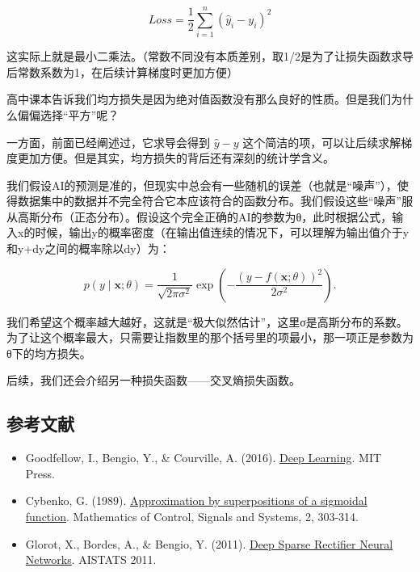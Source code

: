 \[
Loss=\frac{1}{2}\sum_{i=1}^{n}(\hat{y}_i-y_i)^2
\]

这实际上就是最小二乘法。（常数不同没有本质差别，取1/2是为了让损失函数求导后常数系数为1，在后续计算梯度时更加方便）

高中课本告诉我们均方损失是因为绝对值函数没有那么良好的性质。但是我们为什么偏偏选择``平方''呢？

一方面，前面已经阐述过，它求导会得到 \(\hat{y}-y\) 这个简洁的项，可以让后续求解梯度更加方便。但是其实，均方损失的背后还有深刻的统计学含义。

我们假设AI的预测是准的，但现实中总会有一些随机的误差（也就是``噪声''），使得数据集中的数据并不完全符合它本应该符合的函数分布。我们假设这些``噪声''服从高斯分布（正态分布）。假设这个完全正确的AI的参数为θ，此时根据公式，输入x的时候，输出y的概率密度（在输出值连续的情况下，可以理解为输出值介于y和y+dy之间的概率除以dy）为：

\[
p(y \mid \mathbf{x};\theta)=\frac{1}{\sqrt{2\pi\sigma^2}}\exp\left(-\frac{(y-f(\mathbf{x};\theta))^2}{2\sigma^2}\right).
\]

我们希望这个概率越大越好，这就是``极大似然估计''，这里σ是高斯分布的系数。为了让这个概率最大，只需要让指数里的那个括号里的项最小，那一项正是参数为θ下的均方损失。

后续，我们还会介绍另一种损失函数------交叉熵损失函数。

\FloatBarrier
{}
\hypertarget{ux53c2ux8003ux6587ux732e-1}{%
\subsection{参考文献}\label{ux53c2ux8003ux6587ux732e-1}}

\vspace{0.25em}
\begin{itemize}
\tightlist
\item
  Goodfellow, I., Bengio, Y., \& Courville, A. (2016). \href{https://www.deeplearningbook.org/}{Deep Learning}. MIT Press.
\item
  Cybenko, G. (1989). \href{https://doi.org/10.1007/BF02551274}{Approximation by superpositions of a sigmoidal function}. Mathematics of Control, Signals and Systems, 2, 303-314.
\item
  Glorot, X., Bordes, A., \& Bengio, Y. (2011). \href{https://proceedings.mlr.press/v15/glorot11a.html}{Deep Sparse Rectifier Neural Networks}. AISTATS 2011.
\end{itemize}

\clearpage
